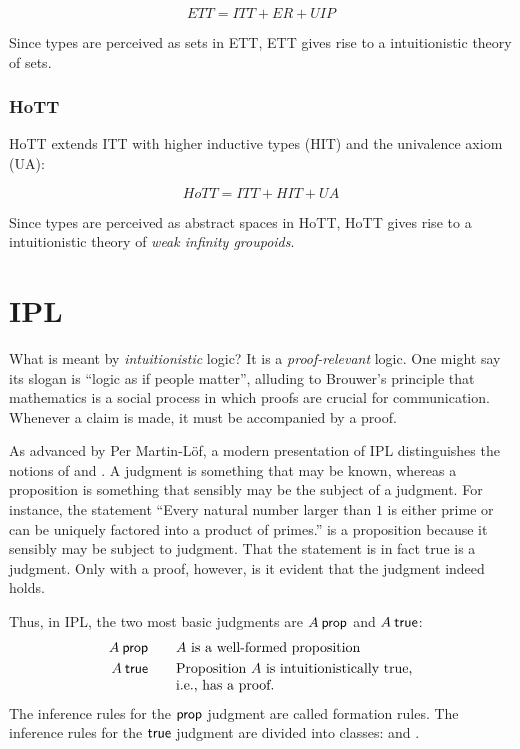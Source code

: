 \documentclass[12pt]{article}
\begin{document}
\begin{equation*}
ETT = ITT + ER + UIP
\end{equation*}

\noindent Since types are perceived as sets in \acs{ETT}, \acs{ETT} gives rise to a
intuitionistic theory of sets.

\subsubsection{\Acl{HoTT}}

\Acs{HoTT} extends \acs{ITT} with higher inductive types (HIT) and the univalence axiom (UA):


\begin{equation*}
HoTT = ITT + HIT + UA
\end{equation*}

\noindent Since types are perceived as abstract spaces in \acs{HoTT}, \acs{HoTT} gives rise to
a intuitionistic theory of \emph{weak infinity groupoids}.

\section{\Acl{IPL}}\label{sec:ipl}

What is meant by \emph{intuitionistic} logic?  It is a \emph{proof-relevant} logic.  One might say its slogan is ``logic as if people matter'', alluding to Brouwer's principle that mathematics is a social process in which proofs are crucial for communication.  Whenever a claim is made, it must be accompanied by a proof.

As advanced by Per Martin-L\"{o}f, a modern presentation of \acf{IPL} distinguishes the notions of  and .
A judgment is something that may be known, whereas a proposition is something that sensibly may be the subject of a judgment.
For instance, the statement ``Every natural number larger than $1$ is either prime or can be uniquely factored into a product of primes\@.'' is a proposition because it sensibly may be subject to judgment.
That the statement is in fact true is a judgment.
Only with a proof, however, is it evident that the judgment indeed holds.

Thus, in \ac{IPL}, the two most basic judgments are $A \prop$ and $A \true$:
\begin{alignat*}{2}
  A \prop &&\quad& \text{$A$ is a well-formed proposition} \\
  A \true &&& \text{\begin{tabular}[t]{@{}l@{}}
                Proposition $A$ is intuitionistically true, \\
                i.e., has a proof.
              \end{tabular}}
\end{alignat*}
The inference rules for the $\prop$ judgment are called formation rules.
The inference rules for the $\true$ judgment are divided into classes:   and .
\end{document}
